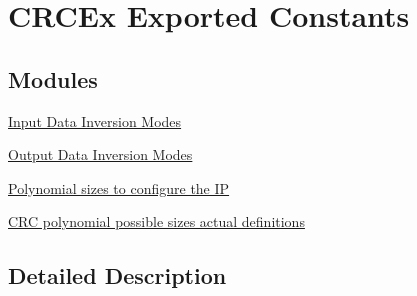 \hypertarget{group___c_r_c_ex___exported___constants}{}\section{C\+R\+C\+Ex Exported Constants}
\label{group___c_r_c_ex___exported___constants}
\subsection*{Modules}
\begin{DoxyCompactItemize}
\item 
\hyperlink{group___c_r_c_ex___input___data___inversion}{Input Data Inversion Modes}
\item 
\hyperlink{group___c_r_c_ex___output___data___inversion}{Output Data Inversion Modes}
\item 
\hyperlink{group___c_r_c_ex___polynomial___sizes}{Polynomial sizes to configure the IP}
\item 
\hyperlink{group___c_r_c_ex___polynomial___size___definitions}{C\+R\+C polynomial possible sizes actual definitions}
\end{DoxyCompactItemize}


\subsection{Detailed Description}
